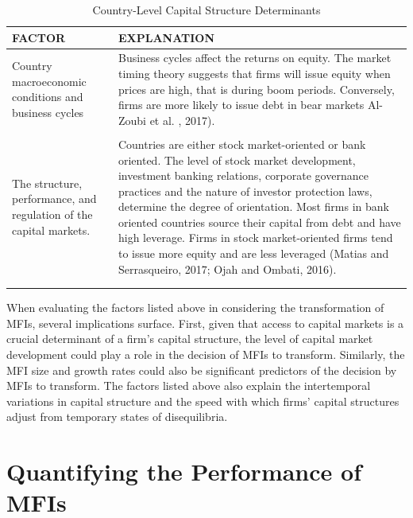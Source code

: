 \documentclass[a4paper, nobind]{templates/ociamthesis}
\begin{document}
\begin{landscape}
\begin{table}
\caption{\label{tab:unnamed-chunk-14}Country-Level Capital Structure Determinants}
\centering
\fontsize{8}{10}\selectfont
\begin{tabu} to 
\toprule
FACTOR & EXPLANATION\\
\midrule
Country macroeconomic conditions and business cycles & Business cycles affect the returns on equity. The market timing theory suggests that firms will issue equity when prices are high, that is during boom periods. Conversely, firms are more likely to issue debt in bear markets Al-Zoubi et al. , 2017).\\
 & \\
The structure, performance, and regulation of the capital markets. & Countries are either stock market-oriented or bank oriented. The level of stock market development, investment banking relations, corporate governance practices and the nature of investor protection laws, determine the degree of orientation. Most firms in bank oriented countries source their capital from debt and have high leverage. Firms in stock market-oriented firms tend to issue more equity and are less leveraged (Matias and Serrasqueiro, 2017; Ojah and Ombati, 2016).\\
\bottomrule
{}\\
\\
\end{tabu}
\end{table}

\end{landscape}

When evaluating the factors listed above in considering the transformation of MFIs, several implications surface. First, given that access to capital markets is a crucial determinant of a firm's capital structure, the level of capital market development could play a role in the decision of MFIs to transform. Similarly, the MFI size and growth rates could also be significant predictors of the decision by MFIs to transform. The factors listed above also explain the intertemporal variations in capital structure and the speed with which firms' capital structures adjust from temporary states of disequilibria.

\hypertarget{quantifying-the-performance-of-mfis}{%
\section{Quantifying the Performance of MFIs}\label{quantifying-the-performance-of-mfis}}
\end{document}
